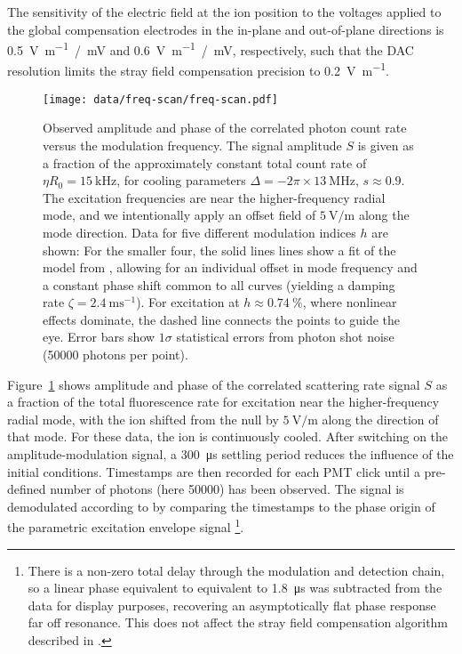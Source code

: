 \documentclass[pra,twocolumn]{revtex4-2}
\begin{document}
The sensitivity of the electric field at the ion position to the voltages applied to the global compensation electrodes in the in-plane and out-of-plane directions is \SI{0.5}{\volt \metre^{-1} / \milli\volt} and \SI{0.6}{\volt \metre^{-1} / \milli\volt}, respectively, such that the DAC resolution limits the stray field compensation precision to \SI{0.2}{\volt \metre^{-1}}.

\begin{figure}
	\texttt{[image: data/freq-scan/freq-scan.pdf]}
	\caption{
		Observed amplitude and phase of the correlated photon count rate versus the modulation frequency.
		The signal amplitude $S$ is given as a fraction of the approximately constant total count rate of $\eta R_0 = \SI{15}{\kilo\hertz}$, for cooling parameters $\Delta = -2\pi \times \SI{13}{\mega\hertz}$, $s \approx 0.9$.
		The excitation frequencies are near the higher-frequency radial mode, and we intentionally apply an offset field of $\SI{5}{\volt/\metre}$ along the mode direction.
		Data for five different modulation indices $h$ are shown:
		For the smaller four, the solid lines lines show a fit of the model from , allowing for an individual offset in mode frequency and a constant phase shift common to all curves (yielding a damping rate $\zeta = \SI{2.4}{\milli\second^{-1}}$).
		For excitation at $h \approx \SI{0.74}{\percent}$, where nonlinear effects dominate, the dashed line connects the points to guide the eye.
		Error bars show $1 \sigma$ statistical errors from photon shot noise (\num{50000} photons per point).
	}
	\label{fig:freq-scan}
\end{figure}

Figure~\ref{fig:freq-scan} shows amplitude and phase of the correlated scattering rate signal $S$ as a fraction of the total fluorescence rate for excitation near the higher-frequency radial mode, with the ion shifted from the \RF{} null by $\SI{5}{\volt / \metre}$ along the direction of that mode.
For these data, the ion is continuously cooled.
After switching on the amplitude-modulation signal, a \SI{300}{\micro\second} settling period reduces the influence of the initial conditions.
Timestamps are then recorded for each PMT click until a pre-defined number of photons (here \num{50000}) has been observed.
The signal is demodulated according to  by comparing the timestamps to the phase origin of the parametric excitation envelope signal \footnote{There is a non-zero total delay through the \RF{} modulation and detection chain, so a linear phase equivalent to equivalent to \SI{1.8}{\micro\second} was subtracted from the data for display purposes, recovering an asymptotically flat phase response far off resonance. This does not affect the stray field compensation algorithm described in .}.
\end{document}
